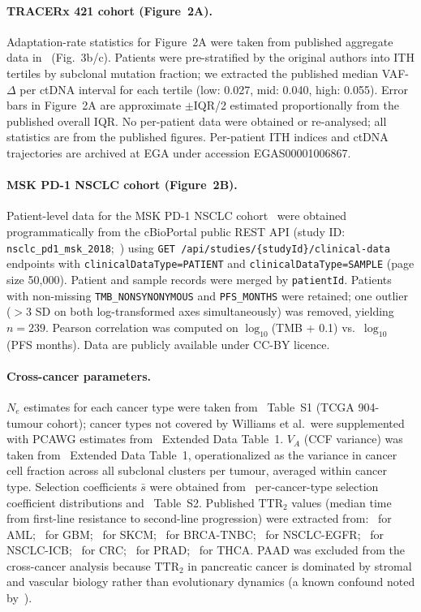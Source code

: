 \documentclass[12pt]{article}
\theoremstyle{remark}
\begin{document}
\paragraph{TRACERx 421 cohort (Figure~2A).} Adaptation-rate statistics for Figure~2A were taken from published aggregate data in~\cite{abbosh2023} (Fig.~3b/c). Patients were pre-stratified by the original authors into ITH tertiles by subclonal mutation fraction; we extracted the published median VAF-$\Delta$ per ctDNA interval for each tertile (low: 0.027, mid: 0.040, high: 0.055). Error bars in Figure~2A are approximate $\pm$IQR/2 estimated proportionally from the published overall IQR. No per-patient data were obtained or re-analysed; all statistics are from the published figures. Per-patient ITH indices and ctDNA trajectories are archived at EGA under accession EGAS00001006867.

\paragraph{MSK PD-1 NSCLC cohort (Figure~2B).} Patient-level data for the MSK PD-1 NSCLC cohort~\cite{hellmann2018} were obtained programmatically from the cBioPortal public REST API (study ID: \texttt{nsclc\_pd1\_msk\_2018};~\cite{cerami2012,gao2013}) using \texttt{GET /api/studies/\{studyId\}/clinical-data} endpoints with \texttt{clinicalDataType=PATIENT} and \texttt{clinicalDataType=SAMPLE} (page size 50,000). Patient and sample records were merged by \texttt{patientId}. Patients with non-missing \texttt{TMB\_NONSYNONYMOUS} and \texttt{PFS\_MONTHS} were retained; one outlier ($>3$ SD on both log-transformed axes simultaneously) was removed, yielding $n = 239$. Pearson correlation was computed on $\log_{10}$(TMB + 0.1) vs.\ $\log_{10}$(PFS months). Data are publicly available under CC-BY licence.

\paragraph{Cross-cancer parameters.} $N_e$ estimates for each cancer type were taken from~\cite{williams2016} Table~S1 (TCGA 904-tumour cohort); cancer types not covered by Williams et al.\ were supplemented with PCAWG estimates from~\cite{dentro2021} Extended Data Table~1. $V_A$ (CCF variance) was taken from~\cite{dentro2021} Extended Data Table~1, operationalized as the variance in cancer cell fraction across all subclonal clusters per tumour, averaged within cancer type. Selection coefficients $\bar{s}$ were obtained from~\cite{tarabichi2021} per-cancer-type selection coefficient distributions and~\cite{williams2016} Table~S2. Published $\mathrm{TTR}_2$ values (median time from first-line resistance to second-line progression) were extracted from: \cite{shlush2017}~for AML; \cite{omuro2013}~for GBM; \cite{wagle2014}~for SKCM; \cite{yates2015}~for BRCA-TNBC; \cite{oxnard2017}~for NSCLC-EGFR; \cite{hellmann2019}~for NSCLC-ICB; \cite{osumi2021}~for CRC; \cite{scher2012}~for PRAD; \cite{haugen2016}~for THCA. PAAD was excluded from the cross-cancer analysis because $\mathrm{TTR}_2$ in pancreatic cancer is dominated by stromal and vascular biology rather than evolutionary dynamics (a known confound noted by~\cite{makohon2017}).
\end{document}
